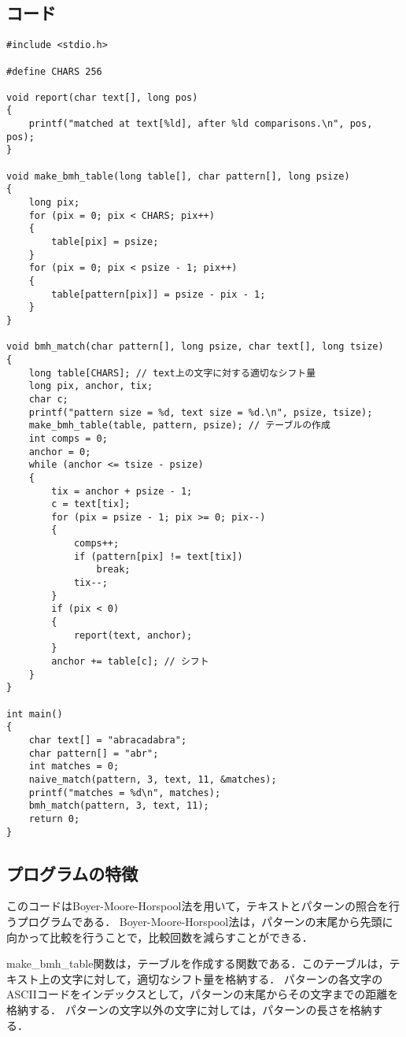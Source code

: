 \documentclass{ltjsarticle}
\begin{document}
\subsection{コード}
\begin{lstlisting}[frame=single, lineskip=-5pt]
#include <stdio.h>

#define CHARS 256

void report(char text[], long pos)
{
    printf("matched at text[%ld], after %ld comparisons.\n", pos, pos);
}

void make_bmh_table(long table[], char pattern[], long psize)
{
    long pix;
    for (pix = 0; pix < CHARS; pix++)
    {
        table[pix] = psize;
    }
    for (pix = 0; pix < psize - 1; pix++)
    {
        table[pattern[pix]] = psize - pix - 1;
    }
}

void bmh_match(char pattern[], long psize, char text[], long tsize)
{
    long table[CHARS]; // text上の文字に対する適切なシフト量
    long pix, anchor, tix;
    char c;
    printf("pattern size = %d, text size = %d.\n", psize, tsize);
    make_bmh_table(table, pattern, psize); // テーブルの作成
    int comps = 0;
    anchor = 0;
    while (anchor <= tsize - psize)
    {
        tix = anchor + psize - 1;
        c = text[tix];
        for (pix = psize - 1; pix >= 0; pix--)
        {
            comps++;
            if (pattern[pix] != text[tix])
                break;
            tix--;
        }
        if (pix < 0)
        {
            report(text, anchor);
        }
        anchor += table[c]; // シフト
    }
}

int main()
{
    char text[] = "abracadabra";
    char pattern[] = "abr";
    int matches = 0;
    naive_match(pattern, 3, text, 11, &matches);
    printf("matches = %d\n", matches);
    bmh_match(pattern, 3, text, 11);
    return 0;
}
\end{lstlisting}

\subsection{プログラムの特徴}
このコードはBoyer-Moore-Horspool法を用いて，テキストとパターンの照合を行うプログラムである．
Boyer-Moore-Horspool法は，パターンの末尾から先頭に向かって比較を行うことで，比較回数を減らすことができる．

make\_bmh\_table関数は，テーブルを作成する関数である．このテーブルは，テキスト上の文字に対して，適切なシフト量を格納する．
パターンの各文字のASCIIコードをインデックスとして，パターンの末尾からその文字までの距離を格納する．
パターンの文字以外の文字に対しては，パターンの長さを格納する．
\end{document}
